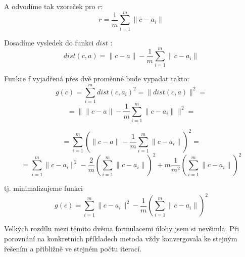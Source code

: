\documentclass[11pt]{article}
\begin{document}
A odvodíme tak vzoreček pro $r$:
$$ r = \dfrac{1}{m}\sum_{i = 1}^{m} \|c-a_{i}\|$$

Dosadíme vysledek do funkci $dist$ :
$$ dist(c, a) =  \|c-a\| - \dfrac{1}{m}\sum_{i = 1}^{m} \|c-a_{i}\|$$


Funkce f vyjadřená přes dvě proměnné bude vypadat takto:
$$g(c) = \sum_{i = 1}^{m} dist(c, a_{i})^{2} = \|dist(c, a)\|^{2} = $$
$$= \|\|c-a\| - \dfrac{1}{m}\sum_{i = 1}^{m} \|c-a_{i}\|\|^{2} = $$

$$ = \sum_{i = 1}^{m}(\|c-a\| - \dfrac{1}{m}\sum_{i = 1}^{m} \|c-a_{i}\|)^{2} = $$
$$ = \sum_{i = 1}^{m} \|c-a_{i}\|^{2} - \dfrac{2}{m} (\sum_{i = 1}^{m} \|c-a_{i}\|)^{2} + m \dfrac{1}{m^{2}} (\sum_{i = 1}^{m} \|c-a_{i}\|)^{2} $$

tj. minimalizujeme funkci
$$
g(c) = \sum_{i = 1}^{m} \|c-a_{i}\|^{2} - \dfrac{1}{m} (\sum_{i = 1}^{m} \|c-a_{i}\|)^{2}
$$

Velkých rozdílu mezi těmito dvěma formulacemi úlohy jsem si nevšimla. Při  porovnání na konkretních příkladech metoda vždy konvergovala ke stejným řešením a přibližně ve stejném počtu iterací. 
\end{document}
